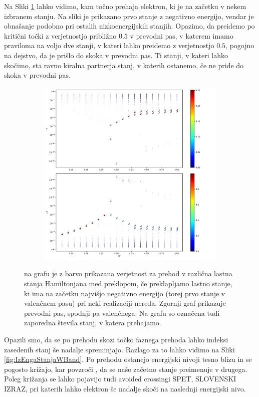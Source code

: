 Na Sliki \ref{fig:IzEngaStanja} lahko vidimo, kam točno prehaja elektron, ki je na začetku v nekem izbranem stanju. Na sliki je prikazano prvo stanje z negativno energijo, vendar je obnašanje podobno pri ostalih nizkoenergijskih stanjih. Opazimo, da preidemo po kritični točki z verjetnostjo približno $0.5$ v prevodni pas, v katerem imamo praviloma na voljo dve stanji, v kateri lahko preidemo z verjetnostjo $0.5$, pogojno na dejstvo, da je prišlo do skoka v prevodni pas. Ti stanji, v kateri lahko skočimo, sta ravno kiralna partnerja stanj, v katerih ostanemo, če ne pride do skoka v prevodni pas.  
\begin{figure}[H]
\centering
\begin{subfigure}{\textwidth}
\includegraphics[width=\linewidth]{Figures/IzEngaStanja.pdf}
\end{subfigure}
\caption{na grafu je z barvo prikazana verjetnost za prehod v različna lastna stanja Hamiltonjana med preklopom, če preklapljamo lastno stanje, ki ima na začetku najvišjo negativno energijo (torej prvo stanje v valenčnem pasu) pri neki realizaciji nereda. Zgornji graf prikazuje prevodni pas, spodnji pa valenčnega. Na grafu so označena tudi zaporedna števila stanj, v katera prehajamo.}
\label{fig:IzEngaStanja}
\end{figure}

Opazili smo, da se po prehodu skozi točko faznega prehoda lahko indeksi zasedenih stanj še nadalje spreminjajo. Razlago za to lahko vidimo na Sliki \ref{fig:IzEngaStanjaWBand}. Po prehodu ostanejo energijski nivoji tesno blizu in se pogosto križajo, kar povzroči , da se naše začetno stanje preimenuje v drugega. Poleg križanja se lahko pojavijo tudi avoided crossingi SPET, SLOVENSKI IZRAZ, pri katerih lahko elektron še nadalje skoči na naslednji energijski nivo.

